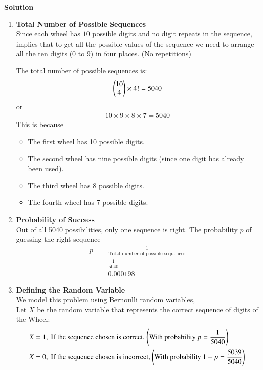 \documentclass[journal]{IEEEtran}
\numberwithin{equation}{enumi}
\numberwithin{figure}{enumi}
\begin{document}
\textbf{Solution}\\
\begin{enumerate}
    \item \textbf{Total Number of Possible Sequences}\\
    Since each wheel has $10$ possible digits and no digit repeats in the sequence, implies that to get all the possible values of the sequence we need to arrange all the ten digits (0 to 9) in four places. (No repetitions)
    
    The total number of possible sequences is:
    \begin{align}
        \begin{pmatrix}10 \\ 4\end{pmatrix} \times {4!} = 5040
    \end{align}
    or 
    \begin{align}
        10 \times 9 \times 8 \times 7 = 5040
    \end{align}
    This is because 
    \begin{itemize}
        \item The first wheel has 10 possible digits.
        \item The second wheel has nine possible digits (since one digit has already been used).
        \item The third wheel has 8 possible digits.
        \item The fourth wheel has 7 possible digits.
    \end{itemize}
    \item \textbf{Probability of Success}\\
    Out of all 5040 possibilities, only one sequence is right. The probability $p$ of guessing the right sequence 
    \begin{align}
        p &= \frac{1}{\text{Total number of possible sequences}}\\ &= \frac{1}{5040}\\ &= 0.000198
    \end{align}
    \newpage
    \item \textbf{Defining the Random Variable}\\
    We model this problem using Bernoulli random variables,\\
    Let $X$ be the random variable that represents the correct sequence of digits of the Wheel:
    \begin{align}
        X &= 1, \text{ If the sequence chosen is correct, \brak{\text{With probability }p = \frac{1}{5040}}}\\
        X &= 0, \text{ If the sequence chosen is incorrect, \brak{\text{With probability } 1 -p = \frac{5039}{5040}}}

\end{align}
\end{enumerate}
\end{document}
